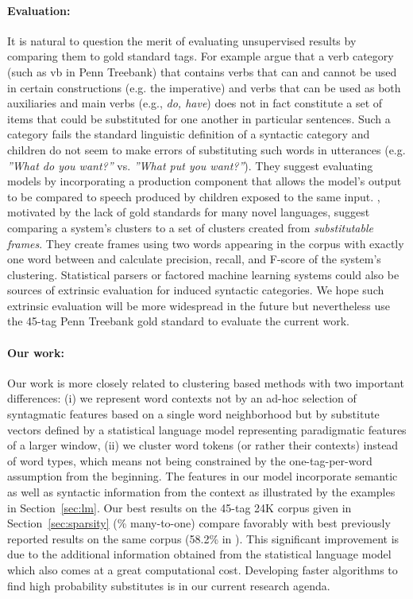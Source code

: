 \documentclass[11pt]{article}
\begin{document}
\paragraph{Evaluation:}
It is natural to question the merit of evaluating unsupervised results
by comparing them to gold standard tags.  For example
\cite{freudenthal2005resolution} argue that a verb category (such as
{\sc vb} in Penn Treebank) that contains verbs that can and cannot be
used in certain constructions (e.g. the imperative) and verbs that can
be used as both auxiliaries and main verbs (e.g., {\em do, have}) does
not in fact constitute a set of items that could be substituted for
one another in particular sentences.  Such a category fails the
standard linguistic definition of a syntactic category and children do
not seem to make errors of substituting such words in utterances
(e.g. {\em''What do you want?''} vs. {\em *''What put you want?''}).
They suggest evaluating models by incorporating a production component
that allows the model's output to be compared to speech produced by
children exposed to the same input.  \cite{frank2009evaluating},
motivated by the lack of gold standards for many novel languages,
suggest comparing a system's clusters to a set of clusters created
from {\em substitutable frames}.  They create frames using two words
appearing in the corpus with exactly one word between and calculate
precision, recall, and F-score of the system's clustering.
Statistical parsers or factored machine learning systems could also be
sources of extrinsic evaluation for induced syntactic categories.  We
hope such extrinsic evaluation will be more widespread in the future
but nevertheless use the 45-tag Penn Treebank gold standard to
evaluate the current work.

\paragraph{Our work:}
Our work is more closely related to clustering based methods with two
important differences: (i) we represent word contexts not by an ad-hoc
selection of syntagmatic features based on a single word neighborhood
but by substitute vectors defined by a statistical language model
representing paradigmatic features of a larger window, (ii) we cluster
word tokens (or rather their contexts) instead of word types, which
means not being constrained by the one-tag-per-word assumption from
the beginning.  The features in our model incorporate semantic as well
as syntactic information from the context as illustrated by the
examples in Section~\ref{sec:lm}.  Our best results on the 45-tag 24K
corpus given in Section~\ref{sec:sparsity} (\collapseResult\% many-to-one)
compare favorably with best previously reported results on the same
corpus (58.2\% in \cite{Gao:2008:CBE:1613715.1613761}).  This
significant improvement is due to the additional information obtained
from the statistical language model which also comes at a great
computational cost.  Developing faster algorithms to find high
probability substitutes is in our current research agenda.
\end{document}
